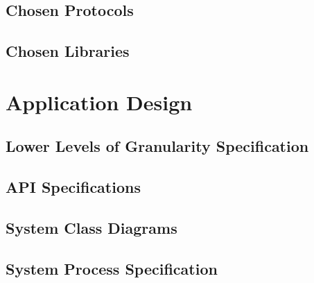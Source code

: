 \documentclass[12pt]{article}
\begin{document}
		
		\subsection{Chosen Protocols}
		
			\vspace{0.2in}
			
		
		\subsection{Chosen Libraries}
			\vspace{0.2in}

			
	\section{Application Design}
			\vspace{0.2in}
					
		\subsection{Lower Levels of Granularity Specification}
				
		\vspace{0.2in}
		
		\subsection{API Specifications}
				\vspace{0.2in}
				
		\subsection{System Class Diagrams }
				\vspace{0.2in}
		
		\subsection{System Process Specification}
				\vspace{0.2in}
		
\end{document}
